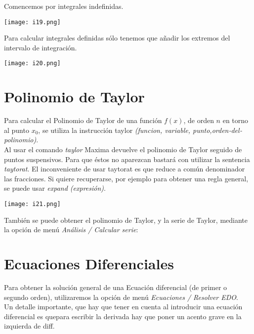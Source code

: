 \documentclass[12pt]{article}
\begin{document}
Comencemos por integrales indefinidas.

\begin{center}
   \texttt{[image: i19.png]}\\
\end{center}

Para calcular integrales definidas sólo tenemos que añadir los extremos del intervalo de integración.
\begin{center}
   \texttt{[image: i20.png]}\\
\end{center}

\section*{Polinomio de Taylor}
Para calcular el Polinomio de Taylor de una función $f(x)$, de orden $n$ en torno al punto $x_0$, se utiliza la instrucción taylor \textit{(funcion, variable, punto,orden‐del‐polinomio)}.\\

Al usar el comando \textit{taylor} Maxima devuelve el polinomio de Taylor seguido de puntos suspensivos. Para que éstos no aparezcan bastará con utilizar la sentencia \textit{taytorat}. El inconveniente de usar taytorat es que reduce a común denominador las fracciones. Si quiere recuperarse, por ejemplo para obtener una regla general, se puede usar \textit{expand (expresión)}.

\begin{center}
   \texttt{[image: i21.png]}\\
\end{center}

También se puede obtener el polinomio de Taylor, y la serie de Taylor, mediante la opción de menú \textit{Análisis / Calcular serie}:

\section*{Ecuaciones Diferenciales}
Para obtener la solución general de una Ecuación diferencial (de primer o segundo orden), utilizaremos la opción de menú \textit{Ecuaciones / Resolver EDO}. \\

Un detalle importante, que hay que tener en cuenta al introducir una ecuación diferencial es quepara escribir la derivada hay que poner un acento grave en la izquierda de diff.\\
\end{document}
